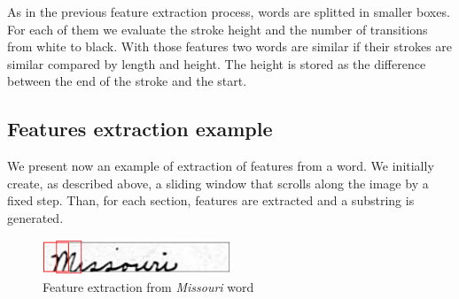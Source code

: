 As in the previous feature extraction process, words are splitted in smaller boxes. For each of them we evaluate the stroke height and the number of transitions from white to black. With those features two words are similar if their strokes are similar compared by length and height. The height is stored as the difference between the end of the stroke and the start.

\subsection{Features extraction example}

We present now an example of extraction of features from a word. We initially create, as described above, a sliding window that scrolls along the image by a fixed step. Than, for each section,  features are extracted and a substring is generated.

\begin{figure}[!ht]
\centering
\includegraphics[width=0.5\textwidth]{images/missouri_crop.jpg}
\caption{Feature extraction from \emph{Missouri} word}
\end{figure} 

